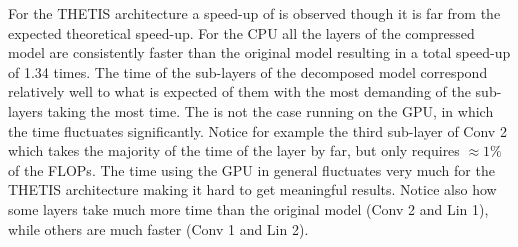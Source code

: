 For the THETIS architecture a speed-up of is observed though it is far from the expected theoretical speed-up. For the CPU all the layers of the compressed model are consistently faster than the original model resulting in a total speed-up of 1.34 times. The time of the sub-layers of the decomposed model correspond relatively well to what is expected of them with the most demanding of the sub-layers taking the most time. The is not the case running on the GPU, in which the time fluctuates significantly. Notice for example the third sub-layer of Conv 2 which takes the majority of the time of the layer by far, but only requires $\approx 1\%$ of the FLOPs. The time using the GPU in general fluctuates very much for the THETIS architecture making it hard to get meaningful results. Notice also how some layers take much more time than the original model (Conv 2 and Lin 1), while others are much faster (Conv 1 and Lin 2).

